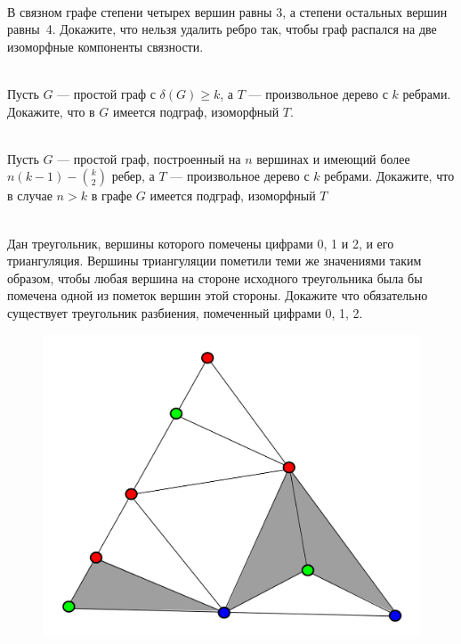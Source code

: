 \documentclass[a4paper,12pt,twoside]{article}
\begin{document}
\begin{?}[Разминочная]\ \\
    В связном графе степени четырех вершин равны 3, а степени остальных вершин равны~4. Докажите, что нельзя удалить ребро так, чтобы граф распался на две изоморфные компоненты связности.
\end{?}
\begin{?}\ \\
    Пусть $G$ --- простой граф с $\delta(G)\geq k$, а $T$ --- произвольное дерево с $k$ ребрами. Докажите, что в $G$ имеется подграф, изоморфный $T$.
\end{?}
\begin{?}\ \\
    Пусть $G$ --- простой граф, построенный на $n$ вершинах и имеющий более $n(k -1) - \binom{k}{2}$ ребер, а $T$ --- произвольное дерево с $k$ ребрами. Докажите, что в случае $n > k$ в графе $G$ имеется подграф, изоморфный $T$
\end{?}
\begin{?}\ \\ 
    Дан треугольник, вершины которого помечены цифрами 0, 1 и 2, и его триангуляция. Вершины триангуляции пометили теми же значениями таким образом, чтобы любая вершина на стороне исходного треугольника была бы помечена одной из пометок вершин этой стороны. Докажите что обязательно существует треугольник разбиения, помеченный цифрами 0, 1, 2. 
    
    \begin{figure}[h!]
        \begin{center}
            \includegraphics[scale=0.1]{images/homework-01-sperner}
        \end{center}
    \end{figure}
\end{?}
\end{document}
